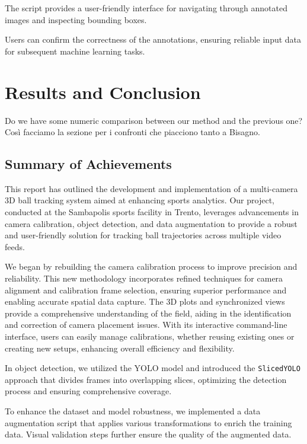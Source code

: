 \documentclass{template}
\begin{document}
The script provides a user-friendly interface for navigating through annotated images and inspecting bounding boxes.

Users can confirm the correctness of the annotations, ensuring reliable input data for subsequent machine learning tasks.

\chapter{Results and Conclusion}

Do we have some numeric comparison between our method and the previous one? Così facciamo la sezione per i confronti che piacciono tanto a Bisagno.
\cite{gulawani2006cfd}

\section{Summary of Achievements}
This report has outlined the development and implementation of a multi-camera 3D ball tracking system aimed at enhancing sports analytics. Our project, conducted at the Sambapolis sports facility in Trento, leverages advancements in camera calibration, object detection, and data augmentation to provide a robust and user-friendly solution for tracking ball trajectories across multiple video feeds.

We began by rebuilding the camera calibration process to improve precision and reliability. This new methodology incorporates refined techniques for camera alignment and calibration frame selection, ensuring superior performance and enabling accurate spatial data capture. 
The 3D plots and synchronized views provide a comprehensive understanding of the field, aiding in the identification and correction of camera placement issues. With its interactive command-line interface, users can easily manage calibrations, whether reusing existing ones or creating new setups, enhancing overall efficiency and flexibility.

In object detection, we utilized the YOLO model and introduced the \texttt{SlicedYOLO} approach that divides frames into overlapping slices, optimizing the detection process and ensuring comprehensive coverage. 

To enhance the dataset and model robustness, we implemented a data augmentation script that applies various transformations to enrich the training data. Visual validation steps further ensure the quality of the augmented data.
\end{document}
